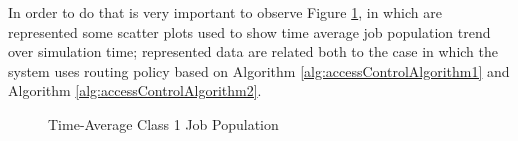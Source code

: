 \documentclass[10pt,a4paper]{article}
\begin{document}
In order to do that is very important to observe Figure \ref{fig:Class1JobsNumberComparasion}, in which are represented some scatter plots used to show time average job population trend over simulation time; represented data are related both to the case in which the system uses routing policy based on Algorithm \ref{alg:accessControlAlgorithm1} and Algorithm \ref{alg:accessControlAlgorithm2}.

\begin{figure}[h!]
    \centering
    \caption{Time-Average Class 1 Job Population}%
    \label{fig:Class1JobsNumberComparasion}
\end{figure}
\end{document}

